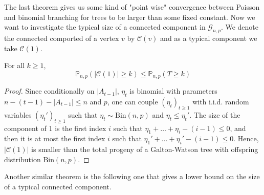 The last theorem gives us some kind of "point wise" convergence between Poisson and binomial branching for trees to be larger than some fixed constant.
\newline
Now we want to investigate the typical size of a connected component in $\mathcal{G}_{n,p}$. We denote the connected comported of a vertex $v$ by $\mathcal{C}(v)$ and as a typical component we take $\mathcal{C}(1)$.
\begin{theorem}
	For all $k\geq1$,
	\begin{equation}
		\mathbb{P}_{n,p}(|\mathcal{C}(1)| \geq k) \leq \mathbb{P}_{n,p}(T\geq k)
	\end{equation}
\end{theorem}
\begin{proof}
	Since conditionally on $|A_{t-1}|$, $\eta_t$ is binomial with parameters $n - (t-1) -|A_{t-1}| \leq n$ and $p$, 
	one can couple $(\eta_t)_{t \geq 1}$ with i.i.d. random variables $(\eta_t')_{t\geq 1}$ such that $\eta_t \sim \text{Bin}(n,p)$ and $\eta_t \leq \eta_t'$.
	\newline
	The size of the component of 1 is the first index $i$ such that $\eta_1 + \ldots + \eta_i - (i-1) \leq 0$, 
	and then it is at most the first index $i$ such that $\eta_1' + \ldots + \eta_i' - (i-1) \leq 0$.
	Hence, $|\mathcal{C}(1)|$ is smaller than the total progeny of a Galton-Watson tree with offspring distribution $\text{Bin}(n,p)$.
	\end{proof}
Another similar theorem is the following one that gives a lower bound on the size of a typical connected component.

